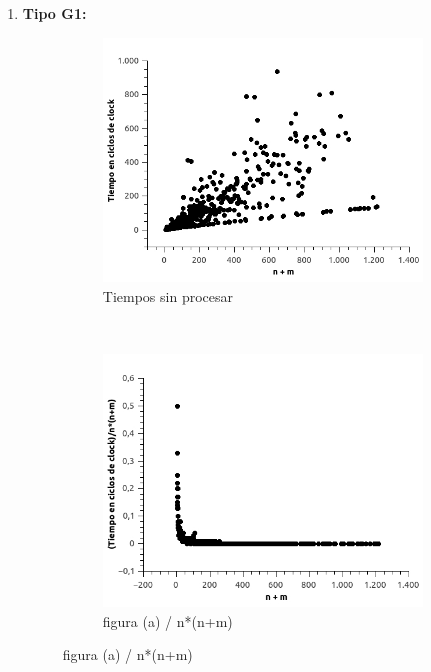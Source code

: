 \begin{enumerate}
\begin{figure}[H]
\end{figure}

\item \textbf{Tipo G1:}

\begin{figure}[H]
        \centering
        \begin{subfigure}[b]{0.5\textwidth}
                \includegraphics[width=\textwidth]{imagenes/ejer4-grafG1-1.jpg}
                \caption{Tiempos sin procesar}
        \end{subfigure}%
        ~ %
        \begin{subfigure}[b]{0.5\textwidth}
                \includegraphics[width=\textwidth]{imagenes/ejer4-grafG1-2.jpg}
                \caption{figura (a) / n*(n+m)}
        \end{subfigure}


\end{figure}
\end{enumerate}
